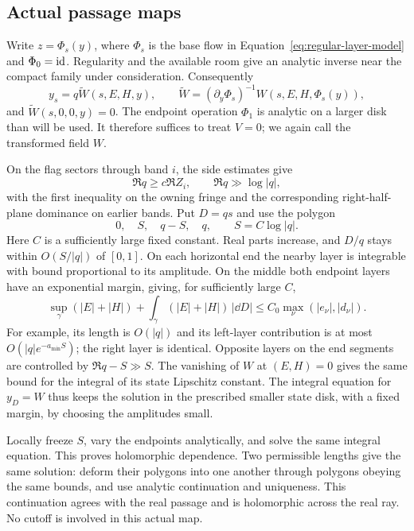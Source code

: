 \subsection{Actual passage maps}

Write $z=\Phi_s(y)$, where $\Phi_s$ is the base flow in
Equation~\eqref{eq:regular-layer-model} and $\Phi_0=\mathrm{id}$.  Regularity and the
available room give an analytic inverse near the compact family under
consideration.  Consequently
\[
 y_s=q\widetilde W(s,E,H,y),\qquad
 \widetilde W=(\partial_y\Phi_s)^{-1}
 W(s,E,H,\Phi_s(y)),
\]
and $\widetilde W(s,0,0,y)=0$.  The endpoint operation $\Phi_1$ is
analytic on a larger disk than will be used.  It therefore suffices to
treat $V=0$; we again call the transformed field $W$.

On the flag sectors through band $i$, the side estimates give
\begin{equation}\label{eq:regular-leading-sector}
 \Re q\ge c\Re Z_i,\qquad \Re q\gg\log|q|,
\end{equation}
with the first inequality on the owning fringe and the corresponding
right-half-plane dominance on earlier bands.  Put $D=qs$ and use the
polygon
\begin{equation}\label{eq:regular-polygon}
 0,\quad S,\quad q-S,\quad q,\qquad S=C\log|q|.
\end{equation}
Here $C$ is a sufficiently large fixed constant.  Real parts increase,
and $D/q$ stays within $O(S/|q|)$ of $[0,1]$.  On each horizontal end the
nearby layer is integrable with bound proportional to its amplitude.
On the middle both endpoint layers have an exponential margin, giving,
for sufficiently large $C$,
\begin{equation}\label{eq:regular-layer-integral}
 \sup_\gamma(|E|+|H|)+
 \int_\gamma(|E|+|H|)\,|\dd D|
 \le C_0\max_\nu(|e_\nu|,|d_\nu|).
\end{equation}
For example, its length is $O(|q|)$ and its left-layer contribution is
at most $O(|q|e^{-a_{\min}S})$; the right layer is identical.  Opposite
layers on the end segments are controlled by
$\Re q-S\gg S$.  The vanishing of $W$ at $(E,H)=0$ gives the same
bound for the integral of its state Lipschitz constant.  The integral
equation for $y_D=W$ thus keeps the solution in the prescribed smaller
state disk, with a fixed margin, by choosing the amplitudes small.

Locally freeze $S$, vary the endpoints analytically, and solve the same
integral equation.  This proves holomorphic dependence.  Two permissible
lengths give the same solution: deform their polygons into one another
through polygons obeying the same bounds, and use analytic continuation
and uniqueness.  This continuation agrees with the real passage and is
holomorphic across the real ray.  No cutoff is involved in this actual
map.

